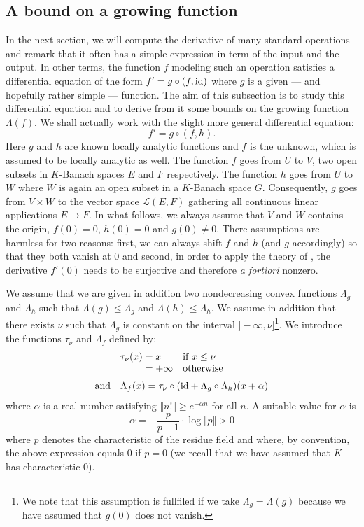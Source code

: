 \documentclass{sig-alternate}
\begin{document}
\subsection{A bound on a growing function}
\label{ssec:boundLambdaf}

In the next section, we will compute the derivative of many standard 
operations and remark that it often has a simple expression in term of 
the input and the output. In other terms, the function $f$ modeling
such an operation satisfies a differential equation of the form
$f' = g \circ (f, \textrm{id})$
where $g$ is a given --- and hopefully rather simple --- function. The 
aim of this subsection is to study this differential equation and to 
derive from it some bounds on the growing function $\Lambda(f)$.
We shall actually work with the slight more general differential 
equation:
\begin{equation}
\label{eq:diffequah}
f' = g \circ (f, h).
\end{equation}
Here $g$ and $h$ are known locally analytic functions and $f$ is the 
unknown, which is assumed to be locally analytic as well. The function
$f$ goes from $U$ to $V$, two open subsets in $K$-Banach spaces $E$ 
and $F$ respectively. The function $h$ goes from $U$ to $W$ where $W$
is again an open subset in a $K$-Banach space $G$. Consequently, $g$
goes from $V \times W$ to the vector space $\mathcal L(E,F)$ gathering
all continuous linear applications $E \to F$.
In what follows, we always assume that $V$ and $W$ contains the origin, 
$f(0) = 0$, $h(0) = 0$ and $g(0) \neq 0$. There assumptions are harmless 
for two reasons: first, we can always shift $f$ and $h$ (and $g$ 
accordingly) so that they both vanish at $0$ and second, in order to 
apply the theory of \cite{caruso-roe-vaccon:14a}, the derivative $f'(0)$ needs to be 
surjective and therefore \emph{a fortiori} nonzero.

We assume that we are given in addition two nondecreasing convex 
functions $\Lambda_g$ and $\Lambda_h$ such that $\Lambda(g) \leq 
\Lambda_g$ and $\Lambda(h) \leq \Lambda_h$. We assume in addition that 
there exists $\nu$ such that $\Lambda_g$ is constant on the interval 
$]{-}\infty, \nu]$\footnote{We note that this assumption is fullfiled if 
we take $\Lambda_g = \Lambda(g)$ because we have assumed that $g(0)$ 
does not vanish.}. We introduce the functions $\tau_\nu$ and $\Lambda_f$ 
defined by:
$$\begin{array}{rll}
&\tau_\nu(x) = x & \text{if } x \leq \nu \\
& \hphantom{\tau_\nu(x)} = {+} \infty & \text{otherwise} \medskip \\
\text{and} &
\multicolumn{2}{l}{\Lambda_f(x) = 
  \tau_\nu \circ (\id + \Lambda_g \circ \Lambda_h)(x + \alpha)}
\end{array}$$
where $\alpha$ is a real number satisfying $\Vert n! \Vert \geq 
e^{-\alpha n}$ for all $n$. A suitable value for $\alpha$ is 
$$\alpha = - \frac p {p-1} \cdot \log \Vert p \Vert > 0$$ 
where $p$ denotes the characteristic of the residue field and where, by 
convention, the above expression equals $0$ if $p = 0$ (we recall that 
we have assumed that $K$ has characteristic $0$).
\end{document}
